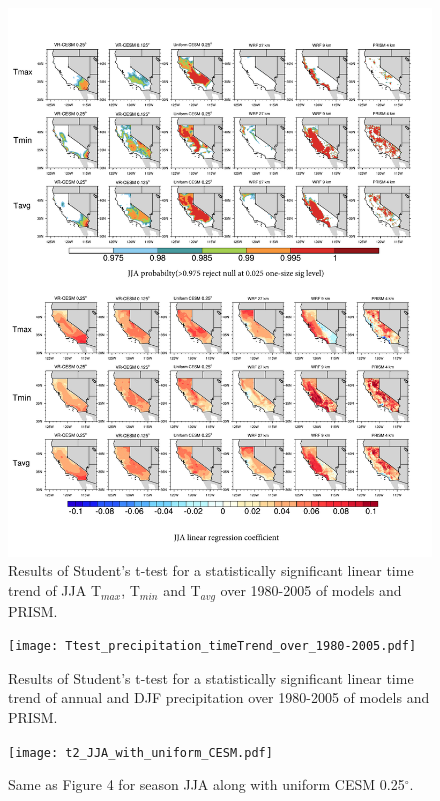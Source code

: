 \documentclass[ms]{agutexSI}
\begin{document}
\begin{figure}
\begin{center}
\includegraphics[width=6in]{Ttest_JJAT2_timeTrend_over_1980-2005.pdf}
\caption{Results of Student's t-test for a statistically significant linear time trend of JJA T$_{max}$, T$_{min}$ and T$_{avg}$ over 1980-2005 of models and PRISM.}
\end{center}
\end{figure}

\begin{figure}
\begin{center}
\texttt{[image: Ttest\_precipitation\_timeTrend\_over\_1980-2005.pdf]}
\caption{Results of Student's t-test for a statistically significant linear time trend of annual and DJF precipitation over 1980-2005 of models and PRISM.}
\end{center}
\end{figure}

\begin{figure}
\begin{center}
\texttt{[image: t2\_JJA\_with\_uniform\_CESM.pdf]}
\caption{Same as Figure 4 for season JJA along with uniform CESM 0.25$^\circ$.}
\end{center}
\end{figure}
\end{document}
